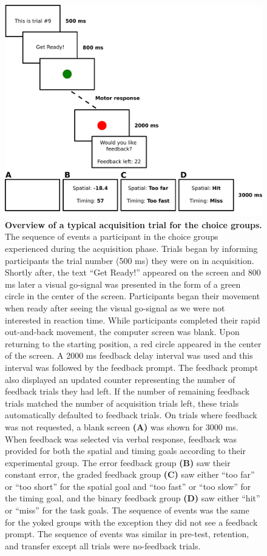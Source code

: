 \documentclass[
  man, donotrepeattitle,floatsintext]{apa7}
\begin{document}
\clearpage

\begin{figure}

{\centering \includegraphics[height=0.45\textheight]{../../figs/fig1} 

}

\caption{\small \normalfont \onehalfspacing \textbf{Overview of a typical acquisition trial for the choice groups.} The sequence of events a participant in the choice groups experienced during the acquisition phase. Trials began by informing participants the trial number (500 ms) they were on in acquisition. Shortly after, the text ``Get Ready!'' appeared on the screen and 800 ms later a visual go-signal was presented in the form of a green circle in the center of the screen. Participants began their movement when ready after seeing the visual go-signal as we were not interested in reaction time. While participants completed their rapid out-and-back movement, the computer screen was blank. Upon returning to the starting position, a red circle appeared in the center of the screen. A 2000 ms feedback delay interval was used and this interval was followed by the feedback prompt. The feedback prompt also displayed an updated counter representing the number of feedback trials they had left. If the number of remaining feedback trials matched the number of acquisition trials left, these trials automatically defaulted to feedback trials. On trials where feedback was not requested, a blank screen \textbf{(A)} was shown for 3000 ms. When feedback was selected via verbal response, feedback was provided for both the spatial and timing goals according to their experimental group. The error feedback group \textbf{(B)} saw their constant error, the graded feedback group \textbf{(C)} saw either ``too far'' or ``too short'' for the spatial goal and ``too fast'' or ``too slow'' for the timing goal, and the binary feedback group \textbf{(D)} saw either ``hit'' or ``miss'' for the task goals. The sequence of events was the same for the yoked groups with the exception they did not see a feedback prompt. The sequence of events was similar in pre-test, retention, and transfer except all trials were no-feedback trials.}\label{fig:fig1}
\end{figure}
\end{document}
